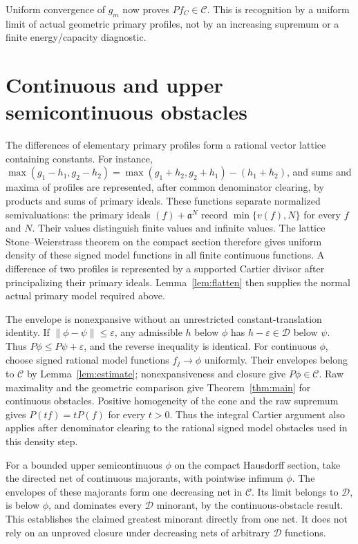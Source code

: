 \documentclass[11pt]{article}
\newcommand{\CC}{\mathcal C}
\newcommand{\DD}{\mathcal D}
\begin{document}
Uniform convergence of $g_m$ now proves $Pf_C\in\CC$. This is recognition
by a uniform limit of actual geometric primary profiles, not by an increasing
supremum or a finite energy/capacity diagnostic.

\section{Continuous and upper semicontinuous obstacles}
The differences of elementary primary profiles form a rational vector
lattice containing constants. For instance,
$\max(g_1-h_1,g_2-h_2)
=\max(g_1+h_2,g_2+h_1)-(h_1+h_2)$, and sums and maxima of profiles are
represented, after common denominator clearing, by products and sums of
primary ideals. These functions separate normalized semivaluations:
the primary ideals $(f)+\mathfrak a^N$ record
$\min\{v(f),N\}$ for every $f$ and $N$. Their values distinguish finite
values and infinite values. The lattice Stone--Weierstrass theorem on the
compact section therefore gives uniform density of these signed model
functions in all finite continuous functions. A difference of two profiles
is represented by a supported Cartier divisor after principalizing their
primary ideals. Lemma~\ref{lem:flatten} then supplies the normal actual
primary model required above.

The envelope is nonexpansive without an unrestricted constant-translation
identity. If $\|\phi-\psi\|\leq\varepsilon$, any admissible $h$ below $\phi$
has $h-\varepsilon\in\DD$ below $\psi$. Thus
$P\phi\leq P\psi+\varepsilon$, and the reverse inequality is identical.
For continuous $\phi$, choose signed rational model functions $f_j\to\phi$
uniformly. Their envelopes belong to $\CC$ by Lemma~\ref{lem:estimate};
nonexpansiveness and closure give $P\phi\in\CC$. Raw maximality and the
geometric comparison give Theorem~\ref{thm:main} for continuous obstacles.
Positive homogeneity of the cone and the raw supremum gives
$P(tf)=tP(f)$ for every $t>0$. Thus the integral Cartier argument also
applies after denominator clearing to the rational signed model obstacles
used in this density step.

For a bounded upper semicontinuous $\phi$ on the compact Hausdorff section,
take the directed net of continuous majorants, with pointwise infimum
$\phi$. The envelopes of these majorants form one decreasing net in
$\CC$. Its limit belongs to $\DD$, is below $\phi$, and dominates every
$\DD$ minorant, by the continuous-obstacle result. This establishes the
claimed greatest minorant directly from one net. It does not rely on an
unproved closure under decreasing nets of arbitrary $\DD$ functions.
\end{document}
